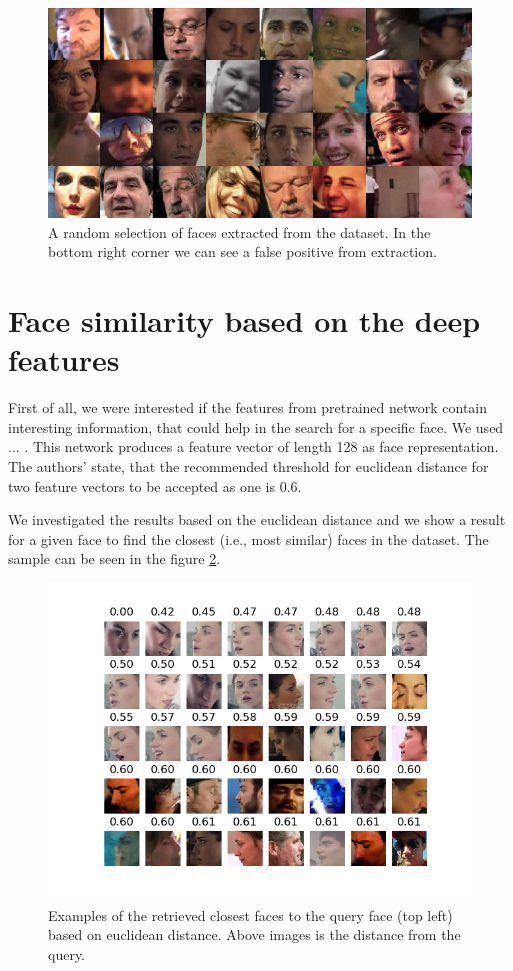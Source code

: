 \begin{figure}
    \centering
    \includegraphics[width=0.98\linewidth]{img/random_sample_faces.png}
    \caption{A random selection of faces extracted from the dataset. In the bottom right corner we can see a false positive from extraction.}
    \label{fig:random_selection_faces}
\end{figure}

\section{Face similarity based on the deep features}

First of all, we were interested if the features from pretrained network contain interesting information, that could help in the search for a specific face. We used ... . This network produces a feature vector of length 128 as face representation. The authors' state, that the recommended threshold for euclidean distance for two feature vectors to be accepted as one is 0.6.

We investigated the results based on the euclidean distance and we show a result for a given face to find the closest (i.e., most similar) faces in the dataset. The sample can be seen in the figure \ref{fig:closest_faces}.


\begin{figure}
    \centering
    \includegraphics[width=\linewidth]{img/closest_faces_to_woman.png}
    \caption{Examples of the retrieved closest faces to the query face (top left) based on euclidean distance. Above images is the distance from the query.}
    \label{fig:closest_faces}
\end{figure}

